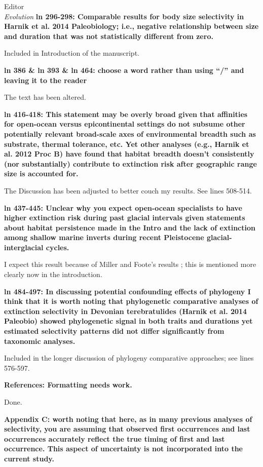 \documentclass{letter}
\begin{document}
\begin{letter}{Editor \\ \textit{Evolution}}
  \textbf{ln 296-298: Comparable results for body size selectivity in Harnik et al. 2014 Paleobiology; i.e., negative relationship between size and duration that was not statistically different from zero.}

  Included in Introduction of the manuscript.

  \textbf{ln 386 \& ln 393 \& ln 464: choose a word rather than using “/” and leaving it to the reader}

  The text has been altered.

  \textbf{ln 416-418: This statement may be overly broad given that affinities for open-ocean versus epicontinental settings do not subsume other potentially relevant broad-scale axes of environmental breadth such as substrate, thermal tolerance, etc. Yet other analyses (e.g., Harnik et al. 2012 Proc B) have found that habitat breadth doesn’t consistently (nor substantially) contribute to extinction risk after geographic range size is accounted for.}

  The Discussion has been adjusted to better couch my results. See lines 508-514.

  \textbf{ln 437-445: Unclear why you expect open-ocean specialists to have higher extinction risk during past glacial intervals given statements about habitat persistence made in the Intro and the lack of extinction among shallow marine inverts during recent Pleistocene glacial-interglacial cycles.}

  I expect this result because of Miller and Foote's results \cite{Miller2009a}; this is mentioned more clearly now in the introduction. 

  \textbf{ln 484-497: In discussing potential confounding effects of phylogeny I think that it is worth noting that phylogenetic comparative analyses of extinction selectivity in Devonian terebratulides (Harnik et al. 2014 Paleobio) showed phylogenetic signal in both traits and durations yet estimated selectivity patterns did not differ significantly from taxonomic analyses.}

  Included in the longer discussion of phylogeny comparative approaches; see lines 576-597.

  \textbf{References: Formatting needs work.}

  Done.

  \textbf{Appendix C: worth noting that here, as in many previous analyses of selectivity, you are assuming that observed first occurrences and last occurrences accurately reflect the true timing of first and last occurrence. This aspect of uncertainty is not incorporated into the current study.}


\end{letter}
\end{document}
